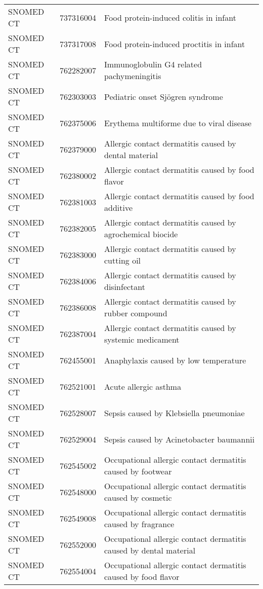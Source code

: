 \begin{longtable}{p{}p{}p{}}
  SNOMED CT & 737316004 & Food protein-induced colitis in infant \\ 
  SNOMED CT & 737317008 & Food protein-induced proctitis in infant \\ 
  SNOMED CT & 762282007 & Immunoglobulin G4 related pachymeningitis \\ 
  SNOMED CT & 762303003 & Pediatric onset Sjögren syndrome \\ 
  SNOMED CT & 762375006 & Erythema multiforme due to viral disease \\ 
  SNOMED CT & 762379000 & Allergic contact dermatitis caused by dental material \\ 
  SNOMED CT & 762380002 & Allergic contact dermatitis caused by food flavor \\ 
  SNOMED CT & 762381003 & Allergic contact dermatitis caused by food additive \\ 
  SNOMED CT & 762382005 & Allergic contact dermatitis caused by agrochemical biocide \\ 
  SNOMED CT & 762383000 & Allergic contact dermatitis caused by cutting oil \\ 
  SNOMED CT & 762384006 & Allergic contact dermatitis caused by disinfectant \\ 
  SNOMED CT & 762386008 & Allergic contact dermatitis caused by rubber compound \\ 
  SNOMED CT & 762387004 & Allergic contact dermatitis caused by systemic medicament \\ 
  SNOMED CT & 762455001 & Anaphylaxis caused by low temperature \\ 
  SNOMED CT & 762521001 & Acute allergic asthma \\ 
  SNOMED CT & 762528007 & Sepsis caused by Klebsiella pneumoniae \\ 
  SNOMED CT & 762529004 & Sepsis caused by Acinetobacter baumannii \\ 
  SNOMED CT & 762545002 & Occupational allergic contact dermatitis caused by footwear \\ 
  SNOMED CT & 762548000 & Occupational allergic contact dermatitis caused by cosmetic \\ 
  SNOMED CT & 762549008 & Occupational allergic contact dermatitis caused by fragrance \\ 
  SNOMED CT & 762552000 & Occupational allergic contact dermatitis caused by dental material \\ 
  SNOMED CT & 762554004 & Occupational allergic contact dermatitis caused by food flavor \\ 

\end{longtable}

